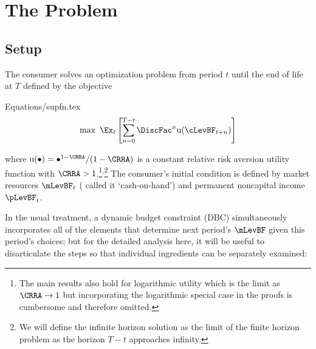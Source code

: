\documentclass[titlepage]{\econtex}\providecommand{\texname}{BufferStockTheory}
\providecommand{\EqDir}{Equations}
\begin{document}
\hypertarget{The-Problem}{}
\section{The Problem}

\subsection{Setup}
\label{subsec:Setup}

The consumer solves an optimization problem from period
$t$ until the end of life at $T$ defined by the objective
\begin{verbatimwrite}{\EqDir/supfn.tex}
\begin{eqnarray}
  \label{eq:supfn}
  \max~ \Ex_{t}\left[\sum_{n=0}^{T-t} \DiscFac^{n} \util(\cLevBF_{t+n})\right]
\end{eqnarray}
\end{verbatimwrite}

where
$\util(\bullet)=\bullet^{1-\CRRA}/(1-\CRRA)$ is a constant relative
risk aversion utility function with $\CRRA > 1$.\footnote{The main
  results also hold for logarithmic utility which is the limit as
  $\CRRA \rightarrow 1$ but incorporating the logarithmic special case
  in the proofs is cumbersome and therefore
  omitted.}$^{,}$\footnote{We will define the infinite horizon
  solution as the limit of the finite horizon problem as the horizon
  $T-t$ approaches infinity.}  The consumer's initial condition is
defined by market resources $\mLevBF_{t}$ (\cite{deatonLiqConstr}
called it `cash-on-hand') and permanent noncapital income $\pLevBF_{t}$.

In the usual treatment, a dynamic budget constraint (DBC) simultaneously incorporates
all of the elements that determine next period's $\mLevBF$ given this
period's choices; but for the detailed analysis here, it will be useful to
disarticulate the steps so that individual ingredients can be separately examined:
\end{document}
